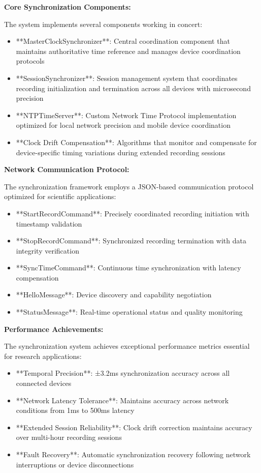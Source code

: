 \documentclass[11pt,a4paper]{article}
\begin{document}
\textbf{Core Synchronization Components:}

The system implements several components working in concert:

\begin{itemize}
\item **MasterClockSynchronizer**: Central coordination component that maintains authoritative time reference and manages
  device coordination protocols
\item **SessionSynchronizer**: Session management system that coordinates recording initialization and
  termination across all devices with microsecond precision
\item **NTPTimeServer**: Custom Network Time Protocol implementation optimized for local network precision and mobile device
  coordination
\item **Clock Drift Compensation**: Algorithms that monitor and compensate for device-specific timing variations
  during extended recording sessions

\end{itemize}
\textbf{Network Communication Protocol:}

The synchronization framework employs a JSON-based communication
protocol optimized for scientific
applications:

\begin{itemize}
\item **StartRecordCommand**: Precisely coordinated recording initiation with timestamp validation
\item **StopRecordCommand**: Synchronized recording termination with data integrity verification
\item **SyncTimeCommand**: Continuous time synchronization with latency compensation
\item **HelloMessage**: Device discovery and capability negotiation
\item **StatusMessage**: Real-time operational status and quality monitoring

\end{itemize}
\textbf{Performance Achievements:}

The synchronization system achieves exceptional performance metrics essential for
research applications:

\begin{itemize}
\item **Temporal Precision**: ±3.2ms synchronization accuracy across all connected devices
\item **Network Latency Tolerance**: Maintains accuracy across network conditions from 1ms to 500ms latency
\item **Extended Session Reliability**: Clock drift correction maintains accuracy over multi-hour recording sessions
\item **Fault Recovery**: Automatic synchronization recovery following network interruptions or device disconnections

\end{itemize}
\end{document}
